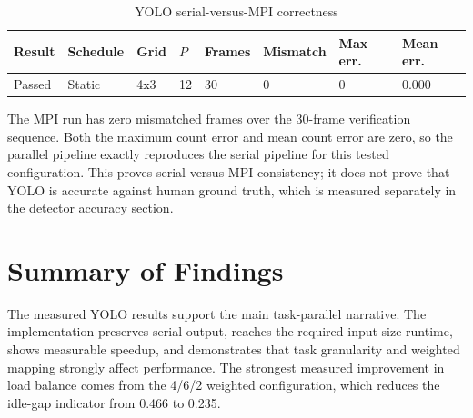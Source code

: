 \begin{table}[H]
\centering
\caption{YOLO serial-versus-MPI correctness}
\label{tab:correctness}
\small
\begin{tabularx}{\textwidth}{L{1.5cm} C{1.6cm} C{0.9cm} C{0.8cm} C{1.1cm} C{1.5cm} C{1.3cm} C{1.2cm}}
\toprule
Result & Schedule & Grid & \(P\) & Frames & Mismatch & Max err. & Mean err. \\
\midrule
Passed & Static & 4x3 & 12 & 30 & 0 & 0 & 0.000 \\
\bottomrule
\end{tabularx}
\end{table}

The MPI run has zero mismatched frames over the 30-frame verification sequence. Both the maximum count error and mean count error are zero, so the parallel pipeline exactly reproduces the serial pipeline for this tested configuration. This proves serial-versus-MPI consistency; it does not prove that YOLO is accurate against human ground truth, which is measured separately in the detector accuracy section.

\section{Summary of Findings}
The measured YOLO results support the main task-parallel narrative. The implementation preserves serial output, reaches the required input-size runtime, shows measurable speedup, and demonstrates that task granularity and weighted mapping strongly affect performance. The strongest measured improvement in load balance comes from the 4/6/2 weighted configuration, which reduces the idle-gap indicator from 0.466 to 0.235.

